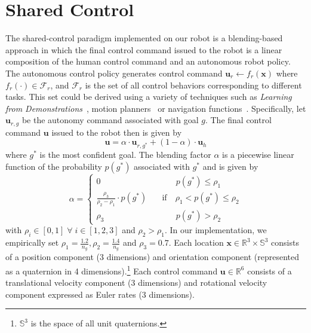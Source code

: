 \documentclass[natbib, twocolumn]{svjour3}          %
\begin{document}
\section{Shared Control}\label{sec:shared-control}
The shared-control paradigm implemented on our robot is a blending-based approach in  which the final control command issued to the robot is a linear composition of the human control command and an autonomous robot policy.
The autonomous control policy generates control command
$\boldsymbol{u}_r \leftarrow f_{r}(\boldsymbol{x})$
where $f_{r}(\cdot) \in \mathcal{F}_{r}$, and $\mathcal{F}_{r}$ is the set of all control behaviors corresponding to different tasks. This set could be derived using a variety of techniques such as \textit{Learning from Demonstrations}~\citep{argall2009survey, schaal1997learning}, motion planners~\citep{hsu2002randomized,ratliff2009chomp} or navigation functions~\citep{rimon1992exact,tanner2003nonholonomic}. Specifically, let $\boldsymbol{u}_{r,g}$ be the autonomy command associated with goal $g$. The final control command $\boldsymbol{u}$ issued to the robot then is given by
\begin{equation*}
\boldsymbol{u} = \alpha\cdot \boldsymbol{u}_{r,g^*} + (1 - \alpha)\cdot \boldsymbol{u}_h
\end{equation*}
where $g^*$ is the most confident goal. The blending factor $\alpha$ is a piecewise linear function of the probability $p(g^*)$ associated with $g^*$ and is given by
$$
\alpha = \left\{
\begin{array}{ll}
0 & \quad\quad~~~ p(g^*) \leq \rho_1 \\
\frac{\rho_3}{\rho_2 - \rho_1}\cdot p(g^*) &  \quad \text{if}\quad \rho_1 < p(g^*) \leq \rho_2  \\
\rho_3 & \quad\quad~~~ p(g^*) > \rho_2 	
\end{array}
\right.
$$
with $\rho_i \in [0, 1] \;\forall\; i \in [1,2,3]$ and $ \rho_2 > \rho_1$. 
In our implementation, we empirically set $\rho_1 = \frac{1.2}{n_g}, \rho_2 = \frac{1.4}{n_g}$ and $ \rho_3 = 0.7$. Each location $\boldsymbol{x} \in \mathbb{R}^3 \times \mathbb{S}^3$ consists of a position component (3 dimensions) and orientation component (represented as a quaternion in 4 dimensions).\footnote{$\mathbb{S}^3$ is the space of all unit quaternions.} Each control command $\boldsymbol{u} \in \mathbb{R}^6$ consists of a translational velocity component (3 dimensions) and rotational velocity component expressed as Euler rates (3 dimensions).
\end{document}
